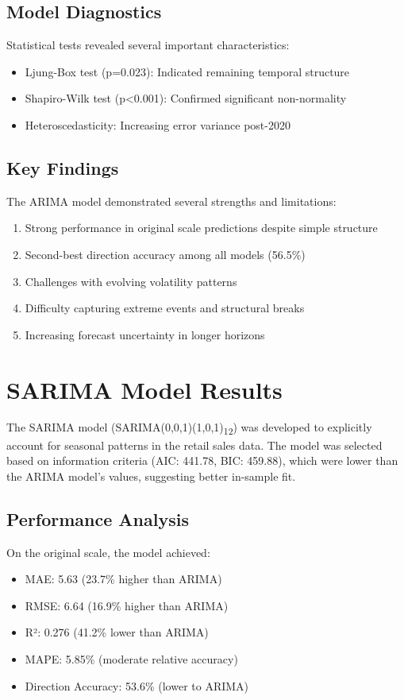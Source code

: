 \documentclass[12pt,a4paper]{report}
\begin{document}
\subsection{Model Diagnostics}
Statistical tests revealed several important characteristics:
\begin{itemize}
    \item Ljung-Box test (p=0.023): Indicated remaining temporal structure
    \item Shapiro-Wilk test (p<0.001): Confirmed significant non-normality
    \item Heteroscedasticity: Increasing error variance post-2020
\end{itemize}

\subsection{Key Findings}
The ARIMA model demonstrated several strengths and limitations:
\begin{enumerate}
    \item Strong performance in original scale predictions despite simple structure
    \item Second-best direction accuracy among all models (56.5\%)
    \item Challenges with evolving volatility patterns
    \item Difficulty capturing extreme events and structural breaks
    \item Increasing forecast uncertainty in longer horizons
\end{enumerate}

\section{SARIMA Model Results}

The SARIMA model (SARIMA(0,0,1)(1,0,1)\textsubscript{12}) was developed to explicitly account for seasonal patterns in the retail sales data. The model was selected based on information criteria (AIC: 441.78, BIC: 459.88), which were lower than the ARIMA model's values, suggesting better in-sample fit.

\subsection{Performance Analysis}
On the original scale, the model achieved:
\begin{itemize}
    \item MAE: 5.63 (23.7\% higher than ARIMA)
    \item RMSE: 6.64 (16.9\% higher than ARIMA)
    \item R²: 0.276 (41.2\% lower than ARIMA)
    \item MAPE: 5.85\% (moderate relative accuracy)
    \item Direction Accuracy: 53.6\% (lower to ARIMA)
\end{itemize}
\end{document}

